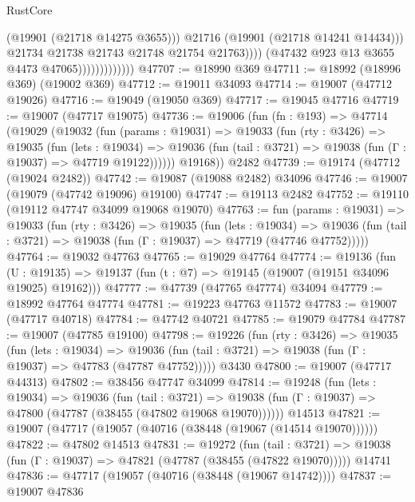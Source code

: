 \begin{lexlean}{RustCore}
\begin{coremodule}
                                        (@19901 (@21718 @14275 @3655)))
                                      @21716
                                      (@19901 (@21718 @14241 @14434)))
                                    @21734
                                    @21738
                                    @21743
                                    @21748
                                    @21754
                                    @21763))))
                            (@47432 @923 @13 @3655 @4473 @47065)))))))))))))
@47707 := @18990 @369
@47711 := @18992 (@18996 @369) (@19002 @369)
@47712 := @19011 @34093
@47714 := @19007 (@47712 @19026)
@47716 := @19049 (@19050 @369)
@47717 := @19045 @47716
@47719 := @19007 (@47717 @19075)
@47736 := @19006
    (fun (fn : @193) =>
    @47714
      (@19029
        (@19032
          (fun (params : @19031) =>
          @19033
            (fun (rty : @3426) =>
            @19035
              (fun (lets : @19034) =>
              @19036 (fun (tail : @3721) => @19038 (fun (Γ : @19037) => @47719 @19122))))))
        @19168))
    @2482
@47739 := @19174 (@47712 (@19024 @2482))
@47742 := @19087 (@19088 @2482) @34096
@47746 := @19007 (@19079 (@47742 @19096) @19100)
@47747 := @19113 @2482
@47752 := @19110 (@19112 @47747 @34099 @19068 @19070)
@47763 := fun (params : @19031) =>
  @19033
    (fun (rty : @3426) =>
    @19035
      (fun (lets : @19034) =>
      @19036 (fun (tail : @3721) => @19038 (fun (Γ : @19037) => @47719 (@47746 @47752)))))
@47764 := @19032 @47763
@47765 := @19029 @47764
@47774 := @19136
    (fun (U : @19135) => @19137 (fun (t : @7) => @19145 (@19007 (@19151 @34096 @19025) @19162)))
@47777 := @47739 (@47765 @47774) @34094
@47779 := @18992 @47764 @47774
@47781 := @19223 @47763 @11572
@47783 := @19007 (@47717 @40718)
@47784 := @47742 @40721
@47785 := @19079 @47784
@47787 := @19007 (@47785 @19100)
@47798 := @19226
    (fun (rty : @3426) =>
    @19035
      (fun (lets : @19034) =>
      @19036 (fun (tail : @3721) => @19038 (fun (Γ : @19037) => @47783 (@47787 @47752)))))
    @3430
@47800 := @19007 (@47717 @44313)
@47802 := @38456 @47747 @34099
@47814 := @19248
    (fun (lets : @19034) =>
    @19036
      (fun (tail : @3721) =>
      @19038 (fun (Γ : @19037) => @47800 (@47787 (@38455 (@47802 @19068 @19070))))))
    @14513
@47821 := @19007 (@47717 (@19057 (@40716 (@38448 (@19067 (@14514 @19070))))))
@47822 := @47802 @14513
@47831 := @19272
    (fun (tail : @3721) => @19038 (fun (Γ : @19037) => @47821 (@47787 (@38455 (@47822 @19070)))))
    @14741
@47836 := @47717 (@19057 (@40716 (@38448 (@19067 @14742))))
@47837 := @19007 @47836

\end{coremodule}
\end{lexlean}
